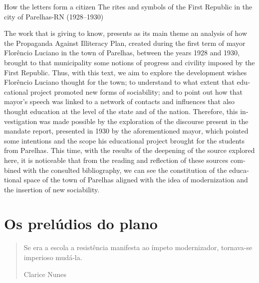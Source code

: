 \begin{refsection}

\begin{otherlanguage}{english}

\fakeChapterTwoLines
{How the letters form a citizen}
{The rites and symbols of the First Republic in the city of Parelhas-RN (1928--1930)}

\begin{galoResumo}[Abstract]
    The work that is giving to know, presents as its main theme an analysis of how the Propaganda Against Illiteracy Plan, created during the first term of mayor Florêncio Luciano in the town of Parelhas, between the years 1928 and 1930, brought to that municipality some notions of progress and civility imposed by the First Republic. Thus, with this text, we aim to explore the development wishes Florêncio Luciano thought for the town; to understand to what extent that educational project promoted new forms of sociability; and to point out how that mayor's speech was linked to a network of contacts and influences that also thought education at the level of the state and of the nation. Therefore, this investigation was made possible by the exploration of the discourse present in the mandate report, presented in 1930 by the aforementioned mayor, which pointed some intentions and the scope his educational project brought for the students from Parelhas. This time, with the results of the deepening of the source explored here, it is noticeable that from the reading and reflection of these sources combined with the consulted bibliography, we can see the constitution of the educational space of the town of Parelhas aligned with the idea of modernization and the insertion of new sociability.
\end{galoResumo}

\end{otherlanguage}

\section{Os prelúdios do plano}

\begin{quotation}
    Se era a escola a resistência manifesta ao ímpeto modernizador, tornava-se imperioso mudá-la.

    \hfill Clarice Nunes \citeyear{Nunes1996Cultura}
\end{quotation}


\end{refsection}
